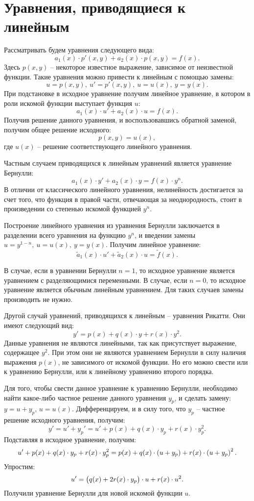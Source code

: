 \section{Уравнения, приводящиеся к линейным}

	Рассматривать будем уравнения следующего вида:
	\[ a_1(x) \cdot p'(x, y) + a_2(x) \cdot p(x, y) = f(x). \]
	Здесь $p(x, y)$ -- некоторое известное выражение, зависимое от неизвестной функции.
	Такие уравнения можно привести к линейным с помощью замены:
	\[ u = p(x, y), ~ u' = p'(x, y), ~ u = u(x), ~ y = y(x). \]
	При подстановке в исходное уравнение получим линейное уравнение, в котором в роли искомой функции выступает функция $u$:
	\[ a_1(x) \cdot u' + a_2(x) \cdot u = f(x). \] 
	Получив решение данного уравнения, и воспользовавшись обратной заменой, получим общее решение исходного:
	\[ p(x, y) = u(x), \]
	где $u(x)$ -- решение соответствующего линейного уравнения.

	Частным случаем приводящихся к линейным уравнений является уравнение Бернулли:
	\[ a_1(x) \cdot y' + a_2(x) \cdot y = f(x) \cdot y^{n}. \]
	В отличии от классического линейного уравнения, нелинейность достигается за счет того, что функция в правой части, отвечающая за неоднородность, стоит в произведении со степенью искомой функцией $y^n$.

	Построение линейного уравнения из уравнения Бернулли заключается в разделении всего уравнения на функцию $y^n$, и введении замены $u = y^{1-n}, ~ u = u(x), ~ y = y(x)$. Получим линейное уравнение:
	\[ \tilde{a}_1(x) \cdot u' + \tilde{a}_2(x) \cdot u = \tilde{f}(x). \]

	В случае, если в уравнении Бернулли $n = 1$, то исходное уравнение является уравнением с разделяющимися переменными. В случае, если $n = 0$, то исходное уравнение является обычным линейным уравнением. Для таких случаев замены производить не нужно.

	Другой случай уравнений, приводящихся к линейным -- уравнения Рикатти. Они имеют следующий вид:
	\[ y' = p(x) + q(x) \cdot y + r(x) \cdot y^2. \]
	Данные уравнения не являются линейными, так как присутствует выражение, содержащее $y^2$. При этом они не являются уравнением Бернулли в силу наличия выражения $p(x)$, не зависимого от искомой функции. Но его можно свести или к уравнению Бернулли, или к линейному уравнению второго порядка.

	Для того, чтобы свести данное уравнение к уравнению Бернулли, необходимо найти какое-либо частное решение данного уравнения $y_p$, и сделать замену: $y = u + y_p$, $u = u(x)$.
	Дифференцируем, и в силу того, что $y_p$ -- частное решение исходного уравнения, получим:
	\[ y' = u' + y_p' = u' + p(x) + q(x) \cdot y_p + r(x) \cdot y_p^2. \]
	Подставляя в исходное уравнение, получим:
	\[ u' + p(x) + q(x) \cdot y_p + r(x) \cdot y_p^2 = p(x) + q(x) \cdot \left( u + y_p \right) + r(x) \cdot \left( u + y_p \right)^2. \]
	Упростим:
	\[ u' = \bigl( q(x) + 2r(x) \cdot y_p \bigr) \cdot u + r(x) \cdot u^2. \]
	Получили уравнение Бернулли для новой искомой функции $u$.

